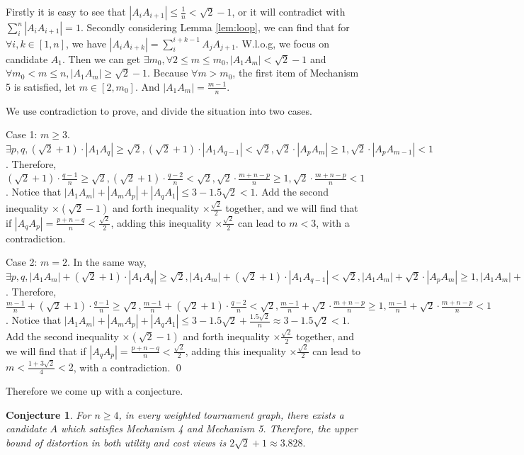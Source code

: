 \documentclass[11pt]{article}
\newtheorem{conjecture}[theorem]{Conjecture}
\theoremstyle{remark}
\begin{document}
Firstly it is easy to see that $|A_{i}A_{i+1}| \le \frac{1}{n} < \sqrt2-1$, or it will contradict with $\sum_{i}^{n}{|A_{i}A_{i+1}|} = 1$. Secondly considering Lemma \ref{lem:loop}, we can find that for $\forall i, k\in [1, n]$, we have $|A_{i}A_{i+k}|=\sum_{i}^{i+k-1}{A_{j}A_{j+1}}$. W.l.o.g, we focus on candidate $A_1$. Then we can get $\exists m_0, \forall 2 \le m \le m_0, |A_1A_m| < \sqrt2-1$ and $\forall m_0 < m \le n, |A_1A_m| \ge \sqrt2-1$. Because $\forall m > m_0$, the first item of Mechanism 5 is satisfied, let $m\in [2, m_0]$. And $|A_1A_m| = \frac{m-1}{n}$.

We use contradiction to prove, and divide the situation into two cases.

Case 1: $m\ge 3$. $\exists p, q, (\sqrt2 + 1)\cdot |A_1A_q| \ge \sqrt2, (\sqrt2 + 1)\cdot |A_1A_{q-1}| < \sqrt2, \sqrt2 \cdot |A_pA_m| \ge 1, \sqrt2 \cdot |A_pA_{m-1}| < 1$. Therefore, $(\sqrt2 + 1)\cdot \frac{q-1}{n} \ge \sqrt2, (\sqrt2 + 1)\cdot \frac{q-2}{n} < \sqrt2, \sqrt2 \cdot \frac{m+n-p}{n} \ge 1, \sqrt2 \cdot \frac{m+n-p}{n} < 1$. Notice that $|A_1A_m|+|A_mA_p|+|A_qA_1| \le 3 - 1.5\sqrt2 < 1$. Add the second inequality $\times (\sqrt2-1)$ and forth inequality $\times \frac{\sqrt2}{2}$ together, and we will find that if $|A_qA_p|=\frac{p+n-q}{n}<\frac{\sqrt2}{2}$, adding this inequality $\times \frac{\sqrt2}{2}$ can lead to $m<3$, with a contradiction.

Case 2: $m=2$. In the same way, $\exists p, q, |A_1A_m| + (\sqrt2 + 1)\cdot |A_1A_q| \ge \sqrt2, |A_1A_m| + (\sqrt2 + 1)\cdot |A_1A_{q-1}| < \sqrt2, |A_1A_m| + \sqrt2 \cdot |A_pA_m| \ge 1, |A_1A_m| + \sqrt2 \cdot |A_pA_{m-1}| < 1$. Therefore, $\frac{m-1}{n} + (\sqrt2 + 1)\cdot \frac{q-1}{n} \ge \sqrt2, \frac{m-1}{n} + (\sqrt2 + 1)\cdot \frac{q-2}{n} < \sqrt2, \frac{m-1}{n} + \sqrt2 \cdot \frac{m+n-p}{n} \ge 1, \frac{m-1}{n} + \sqrt2 \cdot \frac{m+n-p}{n} < 1$.  Notice that $|A_1A_m|+|A_mA_p|+|A_qA_1| \le 3 - 1.5\sqrt2 + \frac{1.5\sqrt2}{n} \approx 3 - 1.5\sqrt2 < 1$. Add the second inequality $\times (\sqrt2-1)$ and forth inequality $\times \frac{\sqrt2}{2}$ together, and we will find that if $|A_qA_p|=\frac{p+n-q}{n}<\frac{\sqrt2}{2}$, adding this inequality $\times \frac{\sqrt2}{2}$ can lead to $m<\frac{1+3\sqrt2}{4}<2$, with a contradiction.
\qed

Therefore we come up with a conjecture.

\begin{conjecture} \label{conj:1}
For $n\ge 4$, in every weighted tournament graph, there exists a candidate $A$ which satisfies Mechanism 4 and Mechanism 5. Therefore, the upper bound of distortion in both utility and cost views is $2\sqrt2+1\approx 3.828.$
\end{conjecture}
\end{document}
